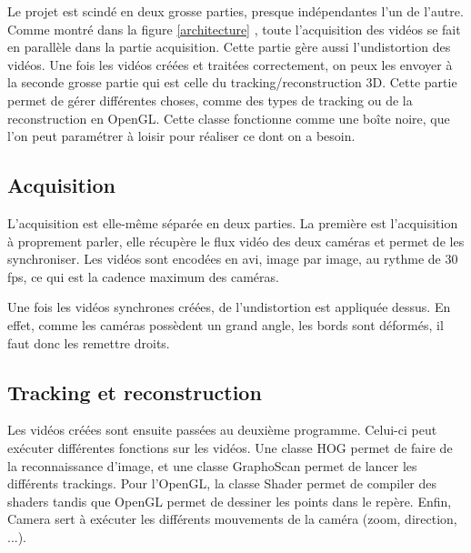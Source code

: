 Le projet est scindé en deux grosse parties, presque indépendantes l'un de l'autre.
Comme montré dans la figure \ref{architecture} , toute l'acquisition des vidéos se fait en parallèle dans la partie acquisition. Cette partie gère aussi l'undistortion des vidéos. Une fois les vidéos créées et traitées correctement, on peux les envoyer à la seconde grosse partie qui est celle du tracking/reconstruction 3D. Cette partie permet de gérer différentes choses, comme des types de tracking ou de la reconstruction en OpenGL. Cette classe fonctionne comme une boîte noire, que l'on peut paramétrer à loisir pour réaliser ce dont on a besoin.

\subsection{Acquisition}
L'acquisition est elle-même séparée en deux parties. La première est l'acquisition à proprement parler, elle récupère le flux vidéo des deux caméras et permet de les synchroniser. Les vidéos sont encodées en avi, image par image, au rythme de 30 fps, ce qui est la cadence maximum des caméras.

Une fois les vidéos synchrones créées, de l'undistortion est appliquée dessus. En effet, comme les caméras possèdent un grand angle, les bords sont déformés, il faut donc les remettre droits.

\subsection{Tracking et reconstruction}

Les vidéos créées sont ensuite passées au deuxième programme. Celui-ci peut exécuter différentes fonctions sur les vidéos. Une classe HOG permet de faire de la reconnaissance d'image, et une classe GraphoScan permet de lancer les différents trackings. Pour l'OpenGL, la classe Shader permet de compiler des shaders tandis que OpenGL permet de dessiner les points dans le repère. Enfin, Camera sert à exécuter les différents mouvements de la caméra (zoom, direction, ...).

